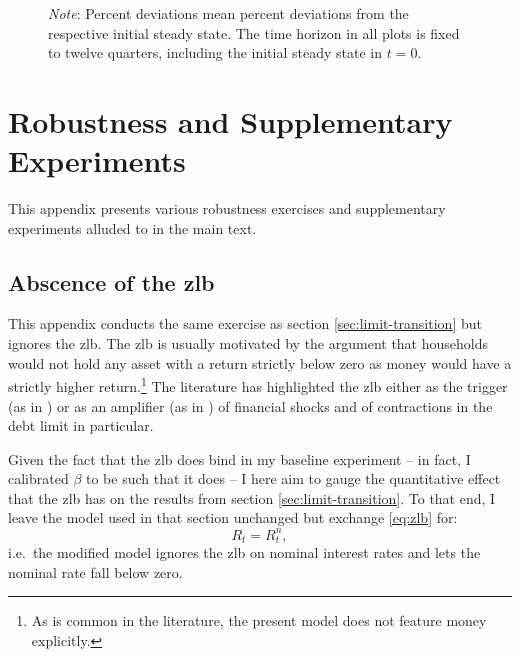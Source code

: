 \documentclass[a4paper,12pt]{article} %
\numberwithin{equation}{section} %
\numberwithin{figure}{section}
\numberwithin{table}{section}
\begin{document}
\begin{refsection}
\begin{appendices}
\begin{figure}[H]
     \vspace{10pt}
     
     \justifying
     \footnotesize
	\textit{Note}: Percent deviations mean percent deviations from the respective initial steady state. The time horizon in all plots is fixed to twelve quarters, including the initial steady state in $t=0$.
\end{figure}

\section{Robustness and Supplementary Experiments}
\label{sec-app:robust}

This appendix presents various robustness exercises and supplementary experiments alluded to in the main text.

\subsection{Abscence of the \Gls{zlb}}
\label{sec-app:robust-no-zlb}

This appendix conducts the same exercise as section \ref{sec:limit-transition} but ignores the \Gls{zlb}. The \Gls{zlb} is usually motivated by the argument that households would not hold any asset with a return strictly below zero as money would have a strictly higher return.\footnote{As is common in the literature, the present model does not feature money explicitly.} The literature has highlighted the \Gls{zlb} either as the trigger (as in \cite{egg2012}) or as an amplifier (as in \cite{gl2017}) of financial shocks and of contractions in the debt limit in particular.

Given the fact that the \Gls{zlb} does bind in my baseline experiment -- in fact, I calibrated $\beta$ to be such that it does -- I here aim to gauge the quantitative effect that the \Gls{zlb} has on the results from section \ref{sec:limit-transition}. To that end, I leave the model used in that section unchanged but exchange \eqref{eq:zlb} for:
\begin{equation}
    R_t = R^n_t, \label{eq:no-zlb}
\end{equation}
i.e.~the modified model ignores the \Gls{zlb} on nominal interest rates and lets the nominal rate fall below zero.


\end{appendices}
\end{refsection}
\end{document}
